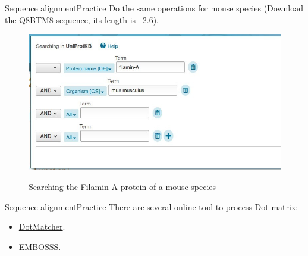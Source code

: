 \documentclass[10pt]{beamer}
\begin{document}
{%
\begin{frame}{Sequence alignment}{Practice}
Do the same operations for mouse species (Download the Q8BTM8 sequence, its length is \string ~2.6). 
\begin{figure}[]
 \centering
    \includegraphics[width=\textwidth,height=0.6\textheight,keepaspectratio]{img/alignment/uniprot5.jpg}
    \label{img:uniprot2}
    \caption{Searching the Filamin-A protein of a mouse species}
\end{figure}
\end{frame}

\begin{frame}{Sequence alignment}{Practice}
There are several online tool to process Dot matrix: 
\begin{itemize}
    \item  \href{http://bioinfo.nhri.org.tw/cgi-bin/emboss/dotmatcher}{DotMatcher}. 
    \item  \href{https://www.ebi.ac.uk/Tools/seqstats/emboss_dotmatcher/}{EMBOSSS}.
\end{itemize}
\end{frame}


}
\end{document}
